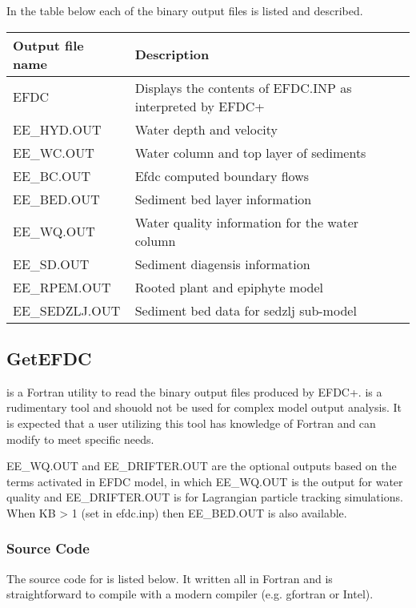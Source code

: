 \documentclass[letterpaper,10pt,english]{sphinxmanual}
\begin{document}
In the table below each of the binary output files is listed and described.


\begin{savenotes}\sphinxattablestart
\centering
\begin{tabulary}{\linewidth}[t]{|T|T|}
\hline
\sphinxstyletheadfamily 
Output file name
&\sphinxstyletheadfamily 
Description
\\
\hline
EFDC
&
Displays the contents of EFDC.INP as interpreted by EFDC+
\\
\hline
EE\_HYD.OUT
&
Water depth and velocity
\\
\hline
EE\_WC.OUT
&
Water column and top layer of sediments
\\
\hline
EE\_BC.OUT
&
Efdc computed boundary flows
\\
\hline
EE\_BED.OUT
&
Sediment bed layer information
\\
\hline
EE\_WQ.OUT
&
Water quality information for the water column
\\
\hline
EE\_SD.OUT
&
Sediment diagensis information
\\
\hline
EE\_RPEM.OUT
&
Rooted plant and epiphyte model
\\
\hline
EE\_SEDZLJ.OUT
&
Sediment bed data for sedzlj sub-model
\\
\hline
\end{tabulary}
\par
\sphinxattableend\end{savenotes}


\subsection{GetEFDC}
\label{\detokenize{outputfiles/getefdc:getefdc}}\label{\detokenize{outputfiles/getefdc:id1}}\label{\detokenize{outputfiles/getefdc::doc}}
 is a Fortran utility to read the binary output files produced by EFDC+.  is a rudimentary tool and shouold not be used for complex model output analysis.  It is expected that a user utilizing this tool has knowledge of Fortran and can modify  to meet specific needs.

EE\_WQ.OUT and EE\_DRIFTER.OUT are the optional outputs based on the terms activated in EFDC model, in which EE\_WQ.OUT is the output for water quality and EE\_DRIFTER.OUT is for Lagrangian particle tracking simulations. When KB \textgreater{} 1 (set in efdc.inp) then EE\_BED.OUT is also available.


\subsubsection{Source Code}
\label{\detokenize{outputfiles/getefdc:source-code}}
The source code for  is listed below.  It written all in Fortran and is straightforward to compile with a modern compiler (e.g. gfortran or Intel).
\end{document}
